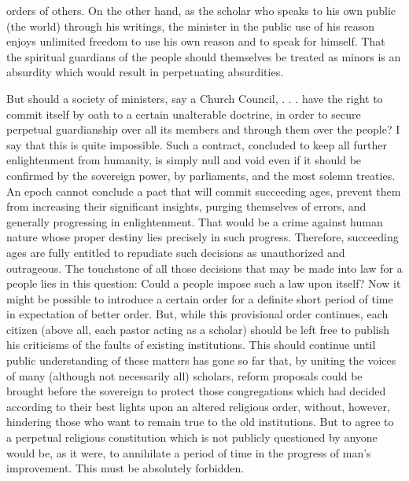 \documentclass[12pt]{article}
\begin{document}
orders of others. On the other hand, as the scholar who speaks to his own public (the world) through his writings, the minister in the public use of his reason enjoys unlimited freedom to use his own reason and to speak for himself. That the spiritual guardians of the people should themselves be treated as minors is an absurdity which would result in perpetuating absurdities.

But should a society of ministers, say a Church Council, . . . have the right to commit itself by oath to a certain unalterable doctrine, in order to secure perpetual guardianship over all its members and through them over the people? I say that this is quite impossible. Such a contract, concluded to keep all further enlightenment from humanity, is simply null and void even if it should be confirmed by the sovereign power, by parliaments, and the most solemn treaties. An epoch cannot conclude a pact that will commit succeeding ages, prevent them from increasing their significant insights, purging themselves of errors, and generally progressing in enlightenment. That would be a crime against human nature whose proper destiny lies precisely in such progress. Therefore, succeeding ages are fully entitled to repudiate such decisions as unauthorized and outrageous. The touchstone of all those decisions that may be made into law for a people lies in this question: Could a people impose such a law upon itself? Now it might be possible to introduce a certain order for a definite short period of time in expectation of better order. But, while this provisional order continues, each citizen (above all, each pastor acting as a scholar) should be left free to publish his criticisms of the faults of existing institutions. This should continue until public understanding of these matters has gone so far that, by uniting the voices of many (although not necessarily all) scholars, reform proposals could be brought before the sovereign to protect those congregations which had decided according to their best lights upon an altered religious order, without, however, hindering those who want to remain true to the old institutions. But to agree to a perpetual religious constitution which is not publicly questioned by anyone would be, as it were, to annihilate a period of time in the progress of man's improvement. This must be absolutely forbidden.
\end{document}
